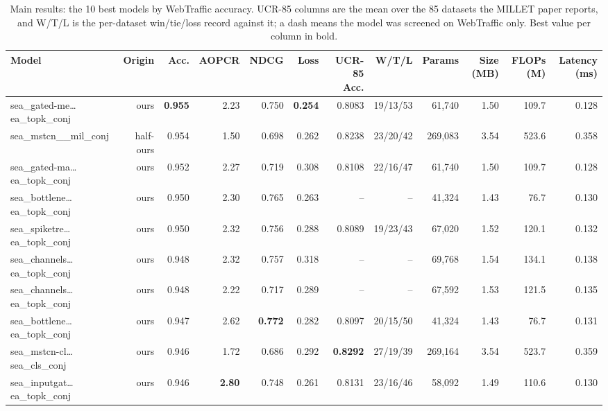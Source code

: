\begin{table}[t]
\centering
\small
\caption{Main results: the 10 best models by WebTraffic accuracy. UCR-85 columns are the mean over the 85 datasets the MILLET paper reports, and W/T/L is the per-dataset win/tie/loss record against it; a dash means the model was screened on WebTraffic only. Best value per column in bold.}
\label{tab:main_results}
\begin{tabular}{lrrrrrrrrrrr}
\toprule
Model & Origin & Acc. & AOPCR & NDCG & Loss & UCR-85 Acc. & W/T/L & Params & Size (MB) & FLOPs (M) & Latency (ms) \\
\midrule
sea\_gated-me\dots{}ea\_topk\_conj & ours & \textbf{0.955} & 2.23 & 0.750 & \textbf{0.254} & 0.8083 & 19/13/53 & 61,740 & 1.50 & 109.7 & 0.128 \\
sea\_mstcn\_\_mil\_conj & half-ours & 0.954 & 1.50 & 0.698 & 0.262 & 0.8238 & 23/20/42 & 269,083 & 3.54 & 523.6 & 0.358 \\
sea\_gated-ma\dots{}ea\_topk\_conj & ours & 0.952 & 2.27 & 0.719 & 0.308 & 0.8108 & 22/16/47 & 61,740 & 1.50 & 109.7 & 0.128 \\
sea\_bottlene\dots{}ea\_topk\_conj & ours & 0.950 & 2.30 & 0.765 & 0.263 & -- & -- & 41,324 & 1.43 & 76.7 & 0.130 \\
sea\_spiketre\dots{}ea\_topk\_conj & ours & 0.950 & 2.32 & 0.756 & 0.288 & 0.8089 & 19/23/43 & 67,020 & 1.52 & 120.1 & 0.132 \\
sea\_channels\dots{}ea\_topk\_conj & ours & 0.948 & 2.32 & 0.757 & 0.318 & -- & -- & 69,768 & 1.54 & 134.1 & 0.138 \\
sea\_channels\dots{}ea\_topk\_conj & ours & 0.948 & 2.22 & 0.717 & 0.289 & -- & -- & 67,592 & 1.53 & 121.5 & 0.135 \\
sea\_bottlene\dots{}ea\_topk\_conj & ours & 0.947 & 2.62 & \textbf{0.772} & 0.282 & 0.8097 & 20/15/50 & 41,324 & 1.43 & 76.7 & 0.131 \\
sea\_mstcn-cl\dots{}sea\_cls\_conj & ours & 0.946 & 1.72 & 0.686 & 0.292 & \textbf{0.8292} & 27/19/39 & 269,164 & 3.54 & 523.7 & 0.359 \\
sea\_inputgat\dots{}ea\_topk\_conj & ours & 0.946 & \textbf{2.80} & 0.748 & 0.261 & 0.8131 & 23/16/46 & 58,092 & 1.49 & 110.6 & 0.130 \\
\bottomrule
\end{tabular}
\end{table}
